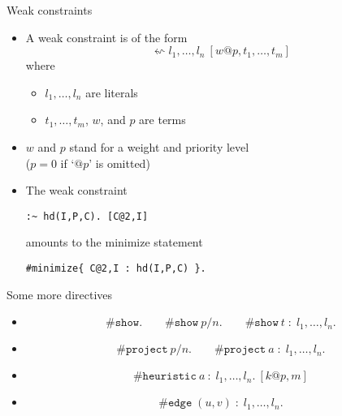 \begin{frame}[fragile]{Weak constraints}
  \begin{itemize}
  \item {} A \alert{weak constraint} is of the form
    \[
    \leftsquigarrow  l_1,\dots, l_n\ [ w@p,t_1, \dots, t_m ]
    \]
    where
    \begin{itemize}\normalsize
    \item $l_1, \dots, l_n$ are literals
    \item $t_1, \dots, t_m$, $w$, and $p$ are terms
    \end{itemize}
  \item[] $w$ and $p$ stand for a weight and priority level
    \\
    ($p=0$ if `$@p$' is omitted)
    \smallskip
  \item<2-> 
    The weak constraint
\begin{lstlisting}
:~ hd(I,P,C). [C@2,I]
\end{lstlisting}
    \pause[3] amounts to the minimize statement
\begin{lstlisting}
#minimize{ C@2,I : hd(I,P,C) }.
\end{lstlisting}
  \end{itemize}
\end{frame}
\begin{frame}{Some more directives}
  \begin{itemize}
  \item<1-> 
    \[
      \#\mathtt{show}.\qquad \#\mathtt{show} \ p/n.\qquad \#\mathtt{show} \ t\; :\; l_1,\dots,l_n.
    \]
    \smallskip
  \item<2-> 
    \[
      \#\mathtt{project} \ p/n.\qquad \#\mathtt{project} \ a\; :\; l_1,\dots,l_n.
    \]
    \smallskip
  \item<3-> 
    \[
      \#\mathtt{heuristic} \ a\ :\; l_1,\dots,l_n. \ [k@p,m]
    \]
    \smallskip
  \item<4-> 
    \[
      \#\mathtt{edge}\; (u,v)\; :\; l_1,\dots,l_n.
    \]
  \end{itemize}
\end{frame}
%
